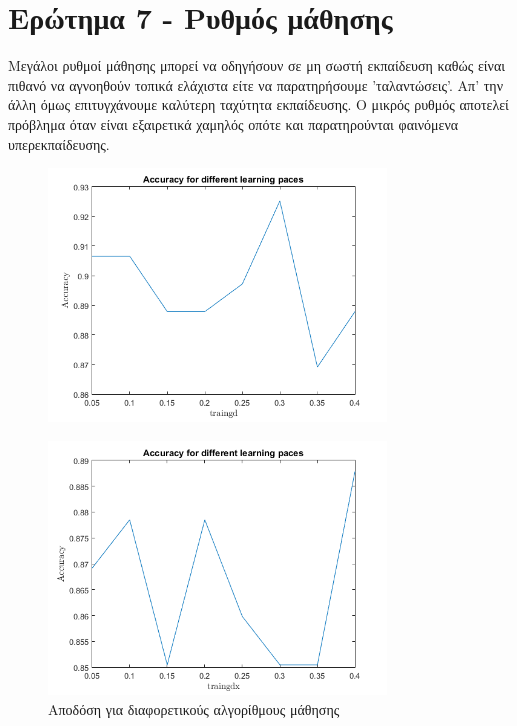 \documentclass[12pt]{article}
\begin{document}
\section*{Ερώτημα 7 - Ρυθμός μάθησης}
Μεγάλοι ρυθμοί μάθησης μπορεί να οδηγήσουν σε μη σωστή εκπαίδευση καθώς είναι πιθανό να αγνοηθούν τοπικά ελάχιστα είτε να παρατηρήσουμε 'ταλαντώσεις'. Απ' την άλλη όμως επιτυγχάνουμε καλύτερη ταχύτητα εκπαίδευσης. Ο μικρός ρυθμός αποτελεί πρόβλημα όταν είναι εξαιρετικά χαμηλός οπότε και παρατηρούνται φαινόμενα υπερεκπαίδευσης. 
\begin{figure}[H]
	 		\centering
			\includegraphics[width=0.8\textwidth]{fakelos/6e-first.png}
			\label{fig:7.learn-rate1}
		\end{figure}
		
\begin{figure}[H]
	 		\centering
			\includegraphics[width=0.8\textwidth]{fakelos/6e-second.png}
			\caption{Αποδόση για διαφορετικούς αλγορίθμους μάθησης}
			\label{fig:7.learn-rate2}
		\end{figure}		
		
\end{document}
